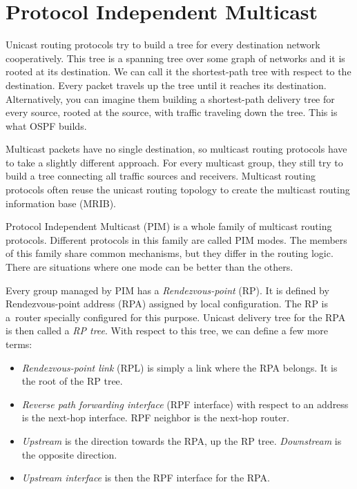 \chapter{Protocol Independent Multicast}

Unicast routing protocols try to build a tree for every destination network
cooperatively. This tree is a spanning tree over some graph of networks and it
is rooted at its destination. We can call it the shortest-path tree with respect
to the destination. Every packet travels up the tree until it reaches its
destination. Alternatively, you can imagine them building a shortest-path
delivery tree for every source, rooted at the source, with traffic traveling
down the tree. This is what OSPF builds.

Multicast packets have no single destination, so multicast routing protocols
have to take a slightly different approach. For every multicast group, they still
try to build a tree connecting all traffic sources and receivers. Multicast
routing protocols often reuse the unicast routing topology to create the
multicast routing information base (MRIB).

Protocol Independent Multicast (PIM) is a whole family of multicast routing
protocols. Different protocols in this family are called PIM modes. The members of this
family share common mechanisms, but they differ in the routing logic. There are
situations where one mode can be better than the others.

Every group managed by PIM has a \emph{Rendezvous-point} (RP). It is defined by
Rendezvous-point address (RPA) assigned by local configuration. The RP is a~router
specially configured for this purpose. Unicast delivery tree for the RPA is then
called a \emph{RP tree}. With respect to this tree, we can define a few more terms:

\begin{itemize}
\item\emph{Rendezvous-point link} (RPL) is simply a link where the RPA belongs.
  It is the root of the RP tree.
\item\emph{Reverse path forwarding interface} (RPF interface) with respect to
  an address is the next-hop interface. RPF neighbor is the next-hop router.
\item\emph{Upstream} is the direction towards the RPA, up the RP tree.
  \emph{Downstream} is the opposite direction.
\item\emph{Upstream interface} is then the RPF interface for the RPA.
\end{itemize}

